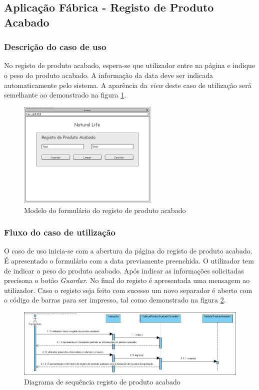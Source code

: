 \subsection{Aplicação Fábrica - Registo de Produto Acabado}
\subsubsection*{Descrição do caso de uso}
No registo de produto acabado, espera-se que utilizador entre na página e indique o peso do produto acabado. A informação da data deve ser indicada automaticamente pelo sistema. A aparência da \textit{view} deste caso de utilização será semelhante ao demonstrado na figura \ref{fig:di_prod_acabado}. 

\begin{figure}[H] 
	\begin{center}
		\includegraphics[width=0.60\textwidth,keepaspectratio]{figuras/Diagramas_vp/DI_Fabrica_4_Registo_de_Produto_Acabado.jpg}
		\caption{Modelo do formulário do registo de produto acabado}
		\label{fig:di_prod_acabado} 
	\end{center}
\end{figure}

\subsubsection*{Fluxo do caso de utilização}
O caso de uso inicia-se com a abertura da página do registo de produto acabado. É apresentado o formulário com a data previamente preenchida. O utilizador tem de indicar o peso do produto acabado. Após indicar as informações solicitadas precisona o botão \textit{Guardar}. No final do registo é apresentada uma mensagem ao utilizador. Caso o registo seja feito com sucesso um novo separador é aberto com o código de barras para ser impresso, tal como demonstrado na figura \ref{fig:sd_prod_acabado}.


\begin{figure}[H] 
	\begin{center}
		\includegraphics[width=\textwidth,keepaspectratio]{figuras/Diagramas_vp/SD_Fabrica_4_Registo_de_Produto_Acabado.jpg}
		\caption{Diagrama de sequência registo de produto acabado}
		\label{fig:sd_prod_acabado} 
	\end{center}
\end{figure}